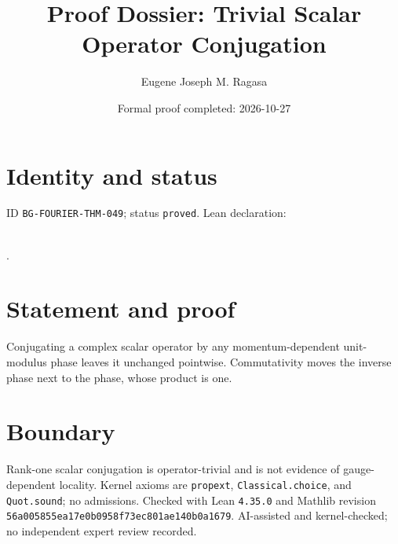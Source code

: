 \documentclass[11pt]{article}
\title{Proof Dossier: Trivial Scalar Operator Conjugation}\author{Eugene Joseph M. Ragasa}\date{Formal proof completed: 2026-10-27}
\begin{document}
\maketitle
\section{Identity and status}
ID \texttt{BG-FOURIER-THM-049}; status \texttt{proved}. Lean declaration:
\par{}\\
{\tiny{}}.
\section{Statement and proof}
Conjugating a complex scalar operator by any momentum-dependent unit-modulus phase leaves
it unchanged pointwise. Commutativity moves the inverse phase next to the phase, whose
product is one.
\section{Boundary}
Rank-one scalar conjugation is operator-trivial and is not evidence of gauge-dependent
locality. Kernel axioms are \texttt{propext}, \texttt{Classical.choice}, and
\texttt{Quot.sound}; no admissions. Checked with Lean \texttt{4.35.0} and Mathlib
revision \texttt{56a005855ea17e0b0958f73ec801ae140b0a1679}. AI-assisted and
kernel-checked; no independent expert review recorded.
\end{document}

